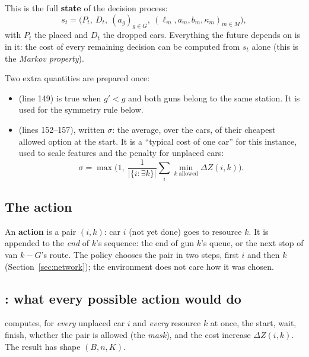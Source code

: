 This is the full \textbf{state} of the decision process:
\[
s_t=\Big(P_t,\ D_t,\ (a_g)_{g\in G},\ (\ell_m,a_m,b_m,\kappa_m)_{m\in M}\Big),
\]
with $P_t$ the placed and $D_t$ the dropped cars. Everything the future depends on is in it: the cost of every remaining decision can be computed from $s_t$ alone (this is the \emph{Markov property}).

Two extra quantities are prepared once:
\begin{itemize}
  \item {} (line 149) is true when $g'<g$ and both guns belong to the same station. It is used for the symmetry rule below.
  \item {} (lines 152--157), written $\sigma$: the average, over the cars, of their cheapest allowed option at the start. It is a ``typical cost of one car'' for this instance, used to scale features and the penalty for unplaced cars:
  \[
  \sigma=\max\Big(1,\ \frac{1}{|\{i:\exists k\}|}\sum_{i}\min_{k\text{ allowed}}\Delta Z(i,k)\Big).
  \]
\end{itemize}

\subsection{The action}

An \textbf{action} is a pair $(i,k)$: car $i$ (not yet done) goes to resource $k$. It is appended to the \emph{end} of $k$'s sequence: the end of gun $k$'s queue, or the next stop of van $k-G$'s route. The policy chooses the pair in two steps, first $i$ and then $k$ (Section~\ref{sec:network}); the environment does not care how it was chosen.

\subsection{: what every possible action would do}
\label{sec:options}

 computes, for \emph{every} unplaced car $i$ and \emph{every} resource $k$ at once, the start, wait, finish, whether the pair is allowed (the \emph{mask}), and the cost increase $\Delta Z(i,k)$. The result has shape $(B,n,K)$.


